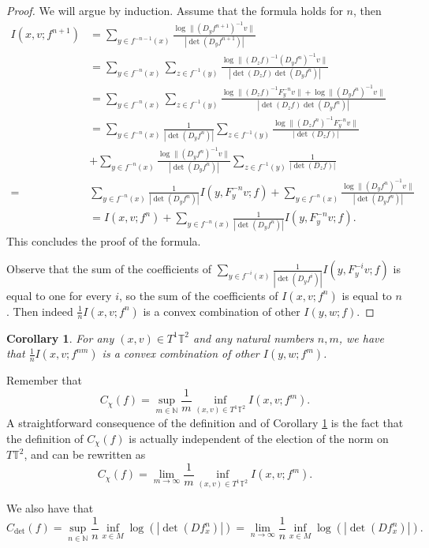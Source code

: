 \documentclass[11pt,letterpaper,reqno]{article}
\newtheorem{corollary}{Corollary}[section]
\newcommand{\TT}{\mathbb{T}^2}
\begin{document}
\begin{proof}
We will argue by induction. Assume that the formula holds for $n$, then
\begin{align*}
I(x,v;f^{n+1})&=\sum_{y\in f^{-n-1}(x)}\frac{\log\|(D_yf^{n+1})^{-1}v\|}{|\det(D_yf^{n+1})|}\\
&=\sum_{y\in f^{-n}(x)}\sum_{z\in f^{-1}(y)}\frac{\log\|(D_zf)^{-1}(D_yf^n)^{-1}v\|}{|\det(D_zf)\det(D_yf^n)|}\\
&=\sum_{y\in f^{-n}(x)}\sum_{z\in f^{-1}(y)}\frac{\log\|(D_zf)^{-1}F_y^{-n}v\|+\log\|(D_yf^n)^{-1}v\|}{|\det(D_zf)\det(D_yf^n)|}\\
&=\sum_{y\in f^{-n}(x)}\frac 1{|\det(D_yf^n)|}\sum_{z\in f^{-1}(y)}\frac{\log\|(D_zf^{n})^{-1}F_y^{-n}v\|}{|\det(D_zf)|}\\
&+\sum_{y\in f^{-n}(x)}\frac{\log\|(D_yf^n)^{-1}v\|}{|\det(D_yf^n)|}\sum_{z\in f^{-1}(y)}\frac 1{|\det(D_zf)|}\\
=&\sum_{y\in f^{-n}(x)}\frac 1{|\det(D_yf^n)|}I(y,F_y^{-n}v;f)+\sum_{y\in f^{-n}(x)}\frac{\log\|(D_yf^n)^{-1}v\|}{|\det(D_yf^n)|}\\
&=I(x,v;f^n)+\sum_{y\in f^{-n}(x)}\frac 1{|\det(D_yf^n)|}I(y,F_y^{-n}v;f).
\end{align*}
This concludes the proof of the formula.

Observe that the sum of the coefficients of $\sum_{y\in f^{-i}(x)}\frac 1{|\det(D_yf^i)|}I(y,F_y^{-i}v;f)$ is equal to one for every $i$, so the sum of the coefficients of $I(x,v;f^n)$ is equal to $n$. Then indeed  $\frac 1nI(x,v;f^n)$ is a convex combination of other $I(y,w;f)$.
\end{proof}

\begin{corollary}\label{cor:convex}
For any $(x,v)\in T^1\TT$ and any natural numbers $n,m$, we have that $\frac 1nI(x,v;f^{nm})$ is a convex combination of other $I(y,w;f^m)$.
\end{corollary}

Remember that
\[
C_{\chi}(f)=\sup_{m\in\mathbb N}\frac 1m\inf_{(x,v)\in T^1\TT}I(x,v;f^m).
\]
A straightforward consequence of the definition and of Corollary \ref{cor:convex} is the fact that the definition of $C_{\chi}(f)$ is actually independent of the election of the norm on $T\TT$, and can be rewritten as
\[
C_{\chi}(f)=\lim_{m\rightarrow\infty}\frac 1m\inf_{(x,v)\in T^1\TT}I(x,v;f^m).
\] 

We also have that
\[
  C_{\det}(f)=\sup_{n\in\mathbb N}\frac 1n\inf_{x\in M}\log(|\det(Df_x^n)|)=\lim_{n\rightarrow\infty} \frac 1n \inf_{x\in M}\log(|\det(Df_x^n)|).
\]
\color{black}
\end{document}
